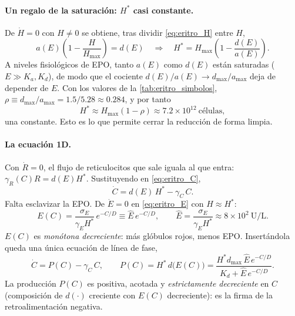 \paragraph{Un regalo de la saturación: $H^*$ casi constante.} De $\dot H=0$ con $H\neq 0$ se obtiene, tras dividir \eqref{eq:eritro_H} entre $H$,
\begin{equation}
    a(E)\left(1 - \frac{H}{H_{\max}}\right) = d(E)
    \quad\Longrightarrow\quad
    H^* = H_{\max}\left(1 - \frac{d(E)}{a(E)}\right).
    \label{eq:eritro_Hstar}
\end{equation}
A niveles fisiológicos de EPO, tanto $a(E)$ como $d(E)$ están saturadas ($E\gg K_a,K_d$), de modo que el cociente $d(E)/a(E)\to d_{\max}/a_{\max}$ deja de depender de $E$. Con los valores de la \cref{tab:eritro_simbolos}, $\rho \equiv d_{\max}/a_{\max}=1.5/5.28\approx 0.284$, y por tanto
\begin{equation}
    H^*\approx H_{\max}(1-\rho)\approx 7.2\times10^{12}\ \text{células},
\end{equation}
una constante. Esto es lo que permite cerrar la reducción de forma limpia.

\paragraph{La ecuación 1D.} Con $\dot R=0$, el flujo de reticulocitos que sale iguala al que entra: $\gamma_R(C)R = d(E)H^*$. Sustituyendo en \eqref{eq:eritro_C},
\begin{equation}
    \dot{C} = d(E)\,H^* - \gamma_C\,C.
\end{equation}
Falta esclavizar la EPO. De $\dot E=0$ en \eqref{eq:eritro_E} con $H\approx H^*$:
\begin{equation}
    E(C) = \frac{\sigma_E}{\gamma_E H^*}\,e^{-C/D} \equiv \hat E\,e^{-C/D},
    \qquad \hat E = \frac{\sigma_E}{\gamma_E H^*}\approx 8\times10^{2}\ \mathrm{U/L}.
    \label{eq:eritro_EC}
\end{equation}
$E(C)$ es \emph{monótona decreciente}: más glóbulos rojos, menos EPO. Insertándola queda una única ecuación de línea de fase,
\begin{equation}
    \boxed{\ \dot{C} = P(C) - \gamma_C\,C, \qquad P(C) = H^*\,d\bigl(E(C)\bigr) = \frac{H^* d_{\max}\,\hat E\,e^{-C/D}}{K_d + \hat E\,e^{-C/D}}.\ }
    \label{eq:eritro_1d}
\end{equation}
La producción $P(C)$ es positiva, acotada y \emph{estrictamente decreciente} en $C$ (composición de $d(\cdot)$ creciente con $E(C)$ decreciente): es la firma de la retroalimentación negativa.

